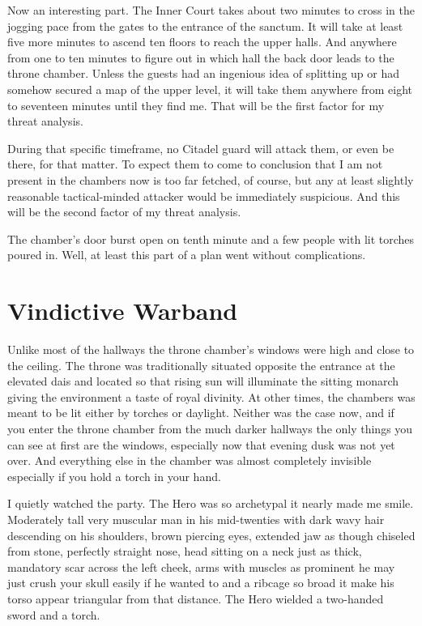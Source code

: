 

Now an interesting part. The Inner Court takes about two minutes to cross in the jogging pace from the gates to the entrance of the sanctum. It will take at least five more minutes to ascend ten floors to reach the upper halls. And anywhere from one to ten minutes to figure out in which hall the back door leads to the throne chamber. Unless the guests had an ingenious idea of splitting up or had somehow secured a map of the upper level, it will take them anywhere from eight to seventeen minutes until they find me. That will be the first factor for my threat analysis.

During that specific timeframe, no Citadel guard will attack them, or even be there, for that matter. To expect them to come to conclusion that I am not present in the chambers now is too far fetched, of course, but any at least slightly reasonable tactical-minded attacker would be immediately suspicious. And this will be the second factor of my threat analysis.

The chamber’s door burst open on tenth minute and a few people with lit torches poured in. Well, at least this part of a plan went without complications.

\section{Vindictive Warband}

Unlike most of the hallways the throne chamber’s windows were high and close to the ceiling. The throne was traditionally situated opposite the entrance at the elevated dais and located so that rising sun will illuminate the sitting monarch giving the environment a taste of royal divinity. At other times, the chambers was meant to be lit either by torches or daylight. Neither was the case now, and if you enter the throne chamber from the much darker hallways the only things you can see at first are the windows, especially now that evening dusk was not yet over. And everything else in the chamber was almost completely invisible especially if you hold a torch in your hand.

I quietly watched the party. The Hero was so archetypal it nearly made me smile. Moderately tall very muscular man in his mid-twenties with dark wavy hair descending on his shoulders, brown piercing eyes, extended jaw as though chiseled from stone, perfectly straight nose, head sitting on a neck just as thick, mandatory scar across the left cheek, arms with muscles as prominent he may just crush your skull easily if he wanted to and a ribcage so broad it make his torso appear triangular from that distance. The Hero wielded a two-handed sword and a torch.

